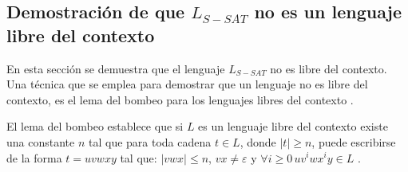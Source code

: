 \subsection{Demostración de que $L_{S-SAT}$ no es un lenguaje libre del contexto}

En esta sección se demuestra que el lenguaje $L_{S-SAT}$ no es libre del contexto. Una técnica que se emplea para demostrar que un lenguaje no es libre del contexto, es el lema del bombeo para los lenguajes
libres del contexto \cite{authomataTheory}. 

El lema del bombeo establece que si $L$ es un lenguaje libre del contexto
existe una constante $n$ tal que para toda cadena $t\in L$, donde $|t|\geq n$, puede escribirse de la forma $t=uvwxy$ tal que:
$|vwx|\leq n$, $vx\neq \varepsilon$ y $\forall i\geq 0\,uv^iwx^iy\in L$ \cite{authomataTheory}.

